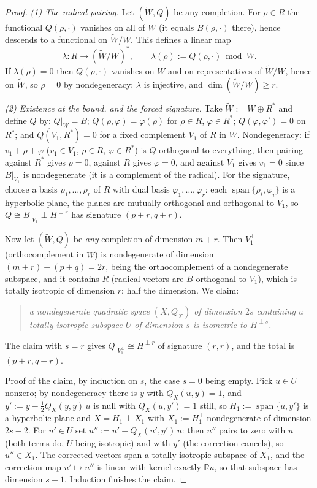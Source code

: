\documentclass[11pt]{article}
\theoremstyle{definition}
\theoremstyle{plain}
\providecommand{\R}{}\renewcommand{\R}{\mathbb{R}}
\begin{document}
\begin{proof}
\emph{(1) The radical pairing.} Let $(\widetilde W, Q)$ be any completion. For $\rho \in R$ the functional $Q(\rho, \cdot)$ vanishes on all of $W$ (it equals $B(\rho, \cdot)$ there), hence descends to a functional on $\widetilde W / W$. This defines a linear map
\[
\lambda : R \longrightarrow (\widetilde W / W)^*, \qquad \lambda(\rho) := Q(\rho, \cdot) \bmod W .
\]
If $\lambda(\rho) = 0$ then $Q(\rho, \cdot)$ vanishes on $W$ and on representatives of $\widetilde W / W$, hence on $\widetilde W$, so $\rho = 0$ by nondegeneracy: $\lambda$ is injective, and $\dim(\widetilde W / W) \geq r$.

\emph{(2) Existence at the bound, and the forced signature.} Take $\widetilde W := W \oplus R^*$ and define $Q$ by: $Q|_W = B$; $Q(\rho, \varphi) = \varphi(\rho)$ for $\rho \in R$, $\varphi \in R^*$; $Q(\varphi, \varphi') = 0$ on $R^*$; and $Q(V_1, R^*) = 0$ for a fixed complement $V_1$ of $R$ in $W$. Nondegeneracy: if $v_1 + \rho + \varphi$ ($v_1 \in V_1$, $\rho \in R$, $\varphi \in R^*$) is $Q$-orthogonal to everything, then pairing against $R^*$ gives $\rho = 0$, against $R$ gives $\varphi = 0$, and against $V_1$ gives $v_1 = 0$ since $B|_{V_1}$ is nondegenerate (it is a complement of the radical). For the signature, choose a basis $\rho_1, \dots, \rho_r$ of $R$ with dual basis $\varphi_1, \dots, \varphi_r$: each $\operatorname{span}\{\rho_i, \varphi_i\}$ is a hyperbolic plane, the planes are mutually orthogonal and orthogonal to $V_1$, so $Q \cong B|_{V_1} \perp H^{\perp r}$ has signature $(p{+}r, q{+}r)$.

Now let $(\widetilde W, Q)$ be \emph{any} completion of dimension $m + r$. Then $V_1^{\perp}$ (orthocomplement in $\widetilde W$) is nondegenerate of dimension $(m{+}r) - (p{+}q) = 2r$, being the orthocomplement of a nondegenerate subspace, and it contains $R$ (radical vectors are $B$-orthogonal to $V_1$), which is totally isotropic of dimension $r$: half the dimension. We claim:
\begin{quote}
\emph{a nondegenerate quadratic space $(X, Q_X)$ of dimension $2s$ containing a totally isotropic subspace $U$ of dimension $s$ is isometric to $H^{\perp s}$.}
\end{quote}
The claim with $s = r$ gives $Q|_{V_1^\perp} \cong H^{\perp r}$ of signature $(r,r)$, and the total is $(p{+}r, q{+}r)$.

Proof of the claim, by induction on $s$, the case $s = 0$ being empty. Pick $u \in U$ nonzero; by nondegeneracy there is $y$ with $Q_X(u, y) = 1$, and $y' := y - \tfrac12 Q_X(y,y)\, u$ is null with $Q_X(u, y') = 1$ still, so $H_1 := \operatorname{span}\{u, y'\}$ is a hyperbolic plane and $X = H_1 \perp X_1$ with $X_1 := H_1^{\perp}$ nondegenerate of dimension $2s - 2$. For $u' \in U$ set $u'' := u' - Q_X(u', y')\, u$: then $u''$ pairs to zero with $u$ (both terms do, $U$ being isotropic) and with $y'$ (the correction cancels), so $u'' \in X_1$. The corrected vectors span a totally isotropic subspace of $X_1$, and the correction map $u' \mapsto u''$ is linear with kernel exactly $\R u$, so that subspace has dimension $s - 1$. Induction finishes the claim.


\end{proof}
\end{document}
